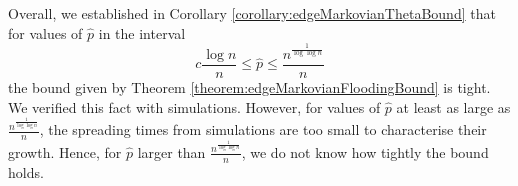 
Overall, we established in Corollary \ref{corollary:edgeMarkovianThetaBound} that for values of $\hat{p}$ in the interval 
$$
	c \frac{\log n}{n} \leq \hat{p} \leq  \frac{n^\frac{1}{\log \log n}}{n}
$$
the bound given by Theorem \ref{theorem:edgeMarkovianFloodingBound} is tight. We verified this fact with simulations. However, for values of $\hat{p}$ at least as large as $\frac{n^\frac{1}{\log \log n}}{n}$, the spreading times from simulations are too small to characterise their growth. Hence, for $\hat{p}$ larger than $\frac{n^\frac{1}{\log \log n}}{n}$, we do not know how tightly the bound holds.
